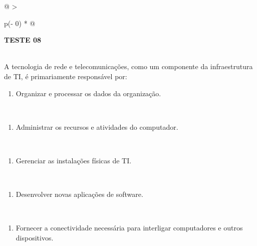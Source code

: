 \documentclass[
]{book}
\providecommand{\tightlist}{%
  \setlength{\itemsep}{0pt}\setlength{\parskip}{0pt}}
\begin{document}
\begin{longtable}[]{@{}
  >{\raggedright\arraybackslash}p{(\columnwidth - 0\tabcolsep) * }@{}}
\toprule\noalign{}
\begin{minipage}[b]{\linewidth}\raggedright
\textbf{TESTE 08}
\end{minipage} \\
\midrule\noalign{}
\endhead
\bottomrule\noalign{}
\endlastfoot
A tecnologia de rede e telecomunicações, como um componente da infraestrutura de TI, é primariamente responsável por: \\
\begin{minipage}[t]{\linewidth}\raggedright
\begin{enumerate}
\def\labelenumi{\Alph{enumi})}
\tightlist
\item
  Organizar e processar os dados da organização.
\end{enumerate}
\end{minipage} \\
\begin{minipage}[t]{\linewidth}\raggedright
\begin{enumerate}
\def\labelenumi{\Alph{enumi})}
\setcounter{enumi}{1}
\tightlist
\item
  Administrar os recursos e atividades do computador.
\end{enumerate}
\end{minipage} \\
\begin{minipage}[t]{\linewidth}\raggedright
\begin{enumerate}
\def\labelenumi{\Alph{enumi})}
\setcounter{enumi}{2}
\tightlist
\item
  Gerenciar as instalações físicas de TI.
\end{enumerate}
\end{minipage} \\
\begin{minipage}[t]{\linewidth}\raggedright
\begin{enumerate}
\def\labelenumi{\Alph{enumi})}
\setcounter{enumi}{3}
\tightlist
\item
  Desenvolver novas aplicações de software.
\end{enumerate}
\end{minipage} \\
\begin{minipage}[t]{\linewidth}\raggedright
\begin{enumerate}
\def\labelenumi{\Alph{enumi})}
\setcounter{enumi}{4}
\tightlist
\item
  Fornecer a conectividade necessária para interligar computadores e outros dispositivos.
\end{enumerate}
\end{minipage} \\
\end{longtable}
\end{document}
